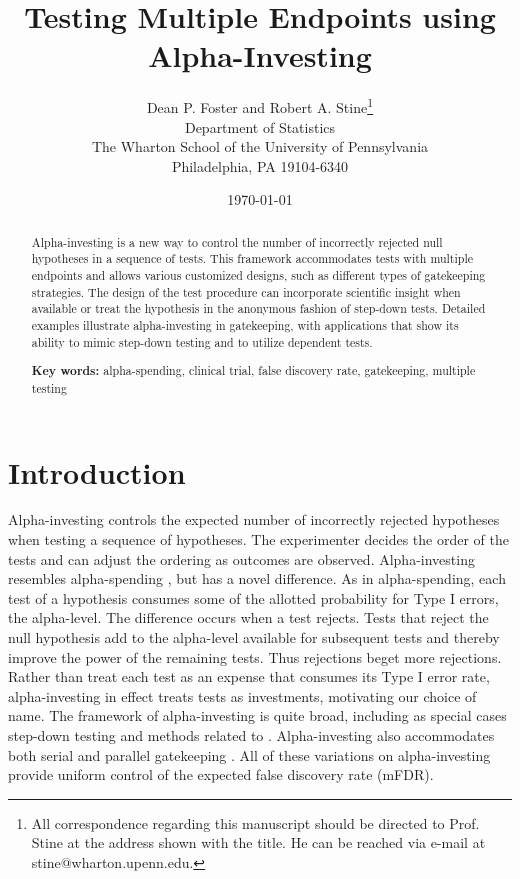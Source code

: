 \documentclass[12pt]{article}
\title{  
        Testing Multiple Endpoints using Alpha-Investing
}
\author{
        Dean P. Foster and Robert A. Stine\footnote{All correspondence
regarding this manuscript should be directed to Prof. Stine at 
the address shown with the title.  He can be reached via e-mail at
stine@wharton.upenn.edu.}                                    \\
        Department of Statistics                             \\
        The Wharton School of the University of Pennsylvania \\
        Philadelphia, PA 19104-6340                          \\
}
\date{\today}
\begin{document}
\maketitle 
\begin{abstract}

 Alpha-investing is a new way to control the number of incorrectly rejected null
 hypotheses in a sequence of tests.  This framework accommodates tests with
 multiple endpoints and allows various customized designs, such as different
 types of gatekeeping strategies.  The design of the test procedure can
 incorporate scientific insight when available or treat the hypothesis in the
 anonymous fashion of step-down tests.  Detailed examples illustrate
 alpha-investing in gatekeeping, with applications that show its ability to
 mimic step-down testing and to utilize dependent tests.

\noindent
 {\bf Key words:} alpha-spending, clinical trial, false discovery rate,
 gatekeeping, multiple testing

\end{abstract}


\newpage

\section{Introduction} %


 Alpha-investing controls the expected number of incorrectly rejected hypotheses
 when testing a sequence of hypotheses.  The experimenter decides the order of
 the tests and can adjust the ordering as outcomes are observed.
  Alpha-investing resembles alpha-spending \citep{demets94}, but has a novel
 difference.  As in alpha-spending, each test of a hypothesis consumes some of
 the allotted probability for Type I errors, the alpha-level.  The difference
 occurs when a test rejects.  Tests that reject the null hypothesis add to the
 alpha-level available for subsequent tests and thereby improve the power of the
 remaining tests.  Thus rejections beget more rejections.  Rather than treat
 each test as an expense that consumes its Type I error rate, alpha-investing in
 effect treats tests as investments, motivating our choice of name.  The
 framework of alpha-investing is quite broad, including as special cases
 step-down testing and methods related to \citet{simes86}.  Alpha-investing also
 accommodates both serial and parallel gatekeeping \citep{dmitrienko03,
 dmitrienko07}.  All of these variations on alpha-investing provide uniform
 control of the expected false discovery rate (mFDR).
\end{document}
